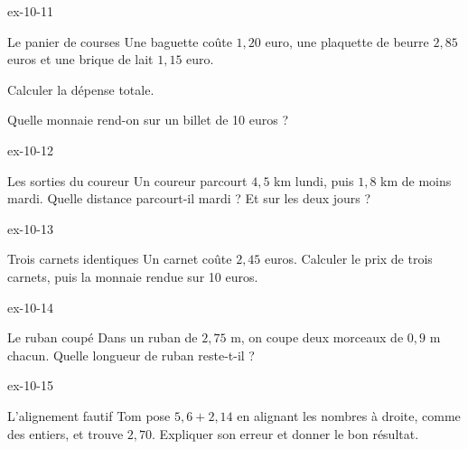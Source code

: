 \begin{blocLivre}{ex-10-11}\begin{exercice}[3]{Le panier de courses}
Une baguette coûte $1{,}20$ euro, une plaquette de beurre $2{,}85$ euros et une brique de lait $1{,}15$ euro.\begin{questions}
\item Calculer la dépense totale.
\item Quelle monnaie rend-on sur un billet de 10 euros ?
\end{questions}
\end{exercice}\end{blocLivre}
\begin{blocLivre}{ex-10-12}\begin{exercice}[3]{Les sorties du coureur}
Un coureur parcourt $4{,}5$ km lundi, puis $1{,}8$ km de moins mardi. Quelle distance parcourt-il mardi ? Et sur les deux jours ?
\end{exercice}\end{blocLivre}
\begin{blocLivre}{ex-10-13}\begin{exercice}[3]{Trois carnets identiques}
Un carnet coûte $2{,}45$ euros. Calculer le prix de trois carnets, puis la monnaie rendue sur 10 euros.
\end{exercice}\end{blocLivre}
\begin{blocLivre}{ex-10-14}\begin{exercice}[3]{Le ruban coupé}
Dans un ruban de $2{,}75$ m, on coupe deux morceaux de $0{,}9$ m chacun. Quelle longueur de ruban reste-t-il ?
\end{exercice}\end{blocLivre}
\begin{blocLivre}{ex-10-15}\begin{exercice}[3]{L’alignement fautif}
Tom pose $5{,}6+2{,}14$ en alignant les nombres à droite, comme des entiers, et trouve $2{,}70$. Expliquer son erreur et donner le bon résultat.
\end{exercice}\end{blocLivre}

\clearpage
